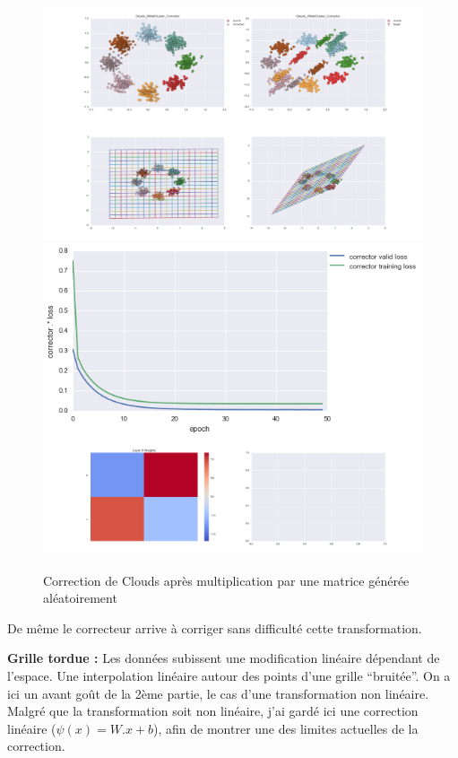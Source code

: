 \begin{figure}[H] %
\centering
\includegraphics[width=\linewidth]{fig/24-05-2016/clouds/Clouds_RMatCluster_Corrector-DATA.png}
\includegraphics[width=\linewidth]{fig/24-05-2016/clouds/Clouds_RMatCluster_Corrector-GridCheck.png}
\includegraphics[width=0.45\linewidth]{fig/24-05-2016/clouds/Clouds_RMatCluster_Corrector-Learning_curve.png}
\includegraphics[width=\linewidth]{fig/24-05-2016/clouds/Clouds_RMatCluster_Corrector-W.png}
\caption{Correction de Clouds après multiplication par une matrice générée aléatoirement}
\label{fig:recap-clouds-RMat-cluster}
\end{figure}

De même le correcteur arrive à corriger sans difficulté cette transformation.

{\Large \textbf{Grille tordue :}} Les données subissent une modification linéaire dépendant de l'espace.
Une interpolation linéaire autour des points d'une grille ``bruitée''.
On a ici un avant goût de la 2ème partie, le cas d'une transformation non linéaire.
Malgré que la transformation soit non linéaire, j'ai gardé ici une correction linéaire ($\psi(x) = W.x+b$),
afin de montrer une des limites actuelles de la correction.

